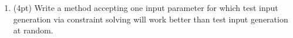 \documentclass{report}
\newif\ifkey
\newcommand{\answerlong}[1]{\ifkey\color{red}\textbf{#1}\color{black}\else\vspace{0.5in}\fi\xspace}
\newcommand*{\pts}[1]{\addtocounter{points}{#1}(#1pt)}
\begin{document}
\begin{spacing}{1.4}
\begin{enumerate}[leftmargin=*]


  \item \pts{4}  Write a method accepting one input parameter for which test input generation
    via constraint solving will work better than test input generation at random.\\
    \answerlong{Answers vary. The key idea is to include a very specific test. For example:\\
      \begin{lstlisting}
        int foo(int x) {
          if (x == 10) return 0;
          else return 1;
        }
      \end{lstlisting}
    }

    \newpage


\end{enumerate}
\end{spacing}
\end{document}
